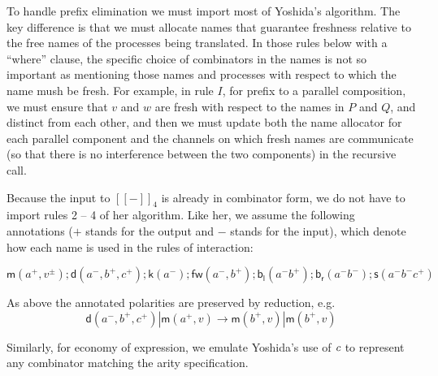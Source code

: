 \documentclass[submission,copyright,creativecommons]{eptcs}
\newcommand{\ldb}{[\![}
\newcommand{\rdb}{]\!]}
\newcommand{\binpar}[2]{#1 | #2}
\newcommand{\meaningof}[1]{\ldb #1 \rdb}
\theoremstyle{definition}
\theoremstyle{remark}
\theoremstyle{remark}
\begin{document}
To handle prefix elimination we must import most of Yoshida's
algorithm. The key difference is that we must allocate names that
guarantee freshness relative to the free names of the processes being
translated. In those rules below with a ``where'' clause, the specific
choice of combinators in the names is not so important as mentioning
those names and processes with respect to which the name mush be fresh.
For example, in rule $I$, for prefix to a parallel
composition, we must ensure that $v$ and $w$ are fresh with respect to
the names in $P$ and $Q$, and distinct from each other, and then we
must update both the name allocator for each parallel component and
the channels on which fresh names are communicate (so that there is no
interference between the two components) in the recursive call. 

Because the input to $\meaningof{-}_4$ is already in combinator form,
we do not have to import rules 2 -- 4 of her algorithm. Like her, we
assume the following annotations ($+$ stands for the output and $-$
stands for the input), which denote how each name is used in the rules
of interaction:

\[\mathsf{m}(a^{+},v^{\pm});\mathsf{d}(a^{-},b^{+},c^{+});\mathsf{k}(a^{-});\mathsf{fw}(a^{-},b^{+});\mathsf{b}_{\mathsf{l}}(a^{-}b^{+});\mathsf{b}_{\mathsf{r}}(a^{-}b^{-});\mathsf{s}(a^{-}b^{-}c^{+})\]

As above the annotated polarities are preserved by reduction, e.g.
\[\binpar{\mathsf{d}(a^{-},b^{+},c^{+})}{\mathsf{m}(a^{+},v)} \to \binpar{\mathsf{m}(b^{+},v)}{\mathsf{m}(b^{+},v)}\]

Similarly, for economy of expression, we emulate Yoshida's use of
$\emph{c}$ to represent any combinator matching the arity
specification. 
\end{document}
